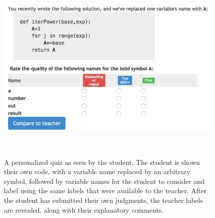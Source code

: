 \begin{figure}
\centering
\includegraphics[width=0.8\columnwidth]{Body/figures/foobaz/foobaz_personalized_quiz.jpg}
\caption{A personalized quiz as seen by the student. The student is shown their own code, with a variable name replaced by an arbitrary symbol, followed by variable names for the student to consider and label using the same labels that were available to the teacher. After the student has submitted their own judgments, the teacher labels are revealed, along with their explanatory comments.}~\label{fig:figure4}
\end{figure}

